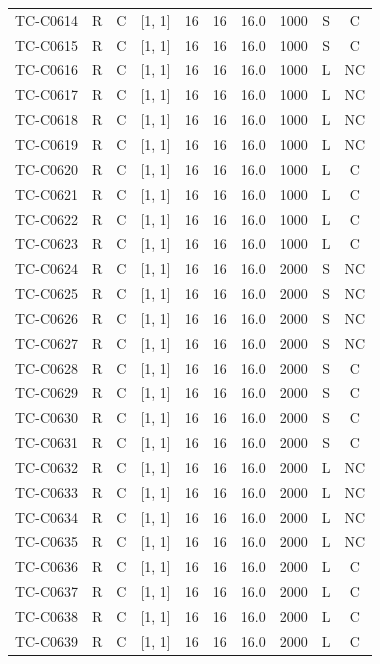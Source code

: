 \begin{longtable}{lccccccccc}
TC-C0614 & R & C & [1, 1] & 16 & 16 & 16.0 & 1000 & S & C \\
TC-C0615 & R & C & [1, 1] & 16 & 16 & 16.0 & 1000 & S & C \\
TC-C0616 & R & C & [1, 1] & 16 & 16 & 16.0 & 1000 & L & NC \\
TC-C0617 & R & C & [1, 1] & 16 & 16 & 16.0 & 1000 & L & NC \\
TC-C0618 & R & C & [1, 1] & 16 & 16 & 16.0 & 1000 & L & NC \\
TC-C0619 & R & C & [1, 1] & 16 & 16 & 16.0 & 1000 & L & NC \\
TC-C0620 & R & C & [1, 1] & 16 & 16 & 16.0 & 1000 & L & C \\
TC-C0621 & R & C & [1, 1] & 16 & 16 & 16.0 & 1000 & L & C \\
TC-C0622 & R & C & [1, 1] & 16 & 16 & 16.0 & 1000 & L & C \\
TC-C0623 & R & C & [1, 1] & 16 & 16 & 16.0 & 1000 & L & C \\
TC-C0624 & R & C & [1, 1] & 16 & 16 & 16.0 & 2000 & S & NC \\
TC-C0625 & R & C & [1, 1] & 16 & 16 & 16.0 & 2000 & S & NC \\
TC-C0626 & R & C & [1, 1] & 16 & 16 & 16.0 & 2000 & S & NC \\
TC-C0627 & R & C & [1, 1] & 16 & 16 & 16.0 & 2000 & S & NC \\
TC-C0628 & R & C & [1, 1] & 16 & 16 & 16.0 & 2000 & S & C \\
TC-C0629 & R & C & [1, 1] & 16 & 16 & 16.0 & 2000 & S & C \\
TC-C0630 & R & C & [1, 1] & 16 & 16 & 16.0 & 2000 & S & C \\
TC-C0631 & R & C & [1, 1] & 16 & 16 & 16.0 & 2000 & S & C \\
TC-C0632 & R & C & [1, 1] & 16 & 16 & 16.0 & 2000 & L & NC \\
TC-C0633 & R & C & [1, 1] & 16 & 16 & 16.0 & 2000 & L & NC \\
TC-C0634 & R & C & [1, 1] & 16 & 16 & 16.0 & 2000 & L & NC \\
TC-C0635 & R & C & [1, 1] & 16 & 16 & 16.0 & 2000 & L & NC \\
TC-C0636 & R & C & [1, 1] & 16 & 16 & 16.0 & 2000 & L & C \\
TC-C0637 & R & C & [1, 1] & 16 & 16 & 16.0 & 2000 & L & C \\
TC-C0638 & R & C & [1, 1] & 16 & 16 & 16.0 & 2000 & L & C \\
TC-C0639 & R & C & [1, 1] & 16 & 16 & 16.0 & 2000 & L & C \\

\end{longtable}
